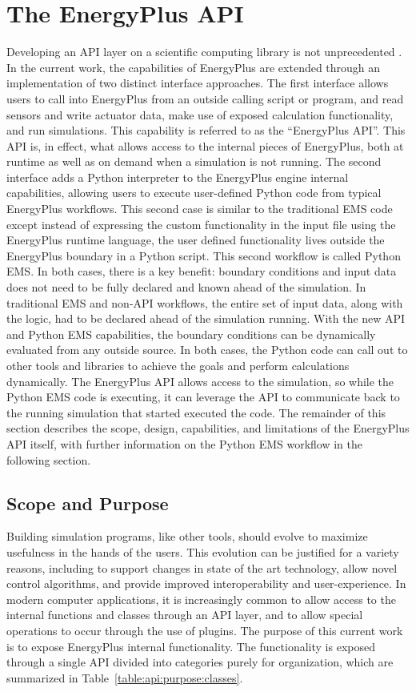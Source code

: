 \documentclass[5p, authoryear]{elsarticle}
\begin{document}
\section{The EnergyPlus API} 
Developing an API layer on a scientific computing library is not unprecedented \citep{Mohanan2018, Gratiy2018, Lotz2020}.
In the current work, the capabilities of EnergyPlus are extended through an implementation of two distinct interface approaches.
The first interface allows users to call into EnergyPlus from an outside calling script or program, and read sensors and write actuator data, make use of exposed calculation functionality, and run simulations.
This capability is referred to as the ``EnergyPlus API''.
This API is, in effect, what allows access to the internal pieces of EnergyPlus, both at runtime as well as on demand when a simulation is not running.
The second interface adds a Python interpreter to the EnergyPlus engine internal capabilities, allowing users to execute user-defined Python code from typical EnergyPlus workflows.  
This second case is similar to the traditional EMS code except instead of expressing the custom functionality in the input file using the EnergyPlus runtime language, the user defined functionality lives outside the EnergyPlus boundary in a Python script.
This second workflow is called Python EMS.
In both cases, there is a key benefit: boundary conditions and input data does not need to be fully declared and known ahead of the simulation.
In traditional EMS and non-API workflows, the entire set of input data, along with the logic, had to be declared ahead of the simulation running.
With the new API and Python EMS capabilities, the boundary conditions can be dynamically evaluated from any outside source.
In both cases, the Python code can call out to other tools and libraries to achieve the goals and perform calculations dynamically.
The EnergyPlus API allows access to the simulation, so while the Python EMS code is executing, it can leverage the API to communicate back to the running simulation that started executed the code.
The remainder of this section describes the scope, design, capabilities, and limitations of the EnergyPlus API itself, with further information on the Python EMS workflow in the following section.
 
  \subsection{Scope and Purpose}
Building simulation programs, like other tools, should evolve to maximize usefulness in the hands of the users.
This evolution can be justified for a variety reasons, including to support changes in state of the art technology, allow novel control algorithms, and provide improved interoperability and user-experience.
In modern computer applications, it is increasingly common to allow access to the internal functions and classes through an API layer, and to allow special operations to occur through the use of plugins.
The purpose of this current work is to expose EnergyPlus internal functionality.
The functionality is exposed through a single API divided into categories purely for organization, which are summarized in Table~\ref{table:api:purpose:classes}.
\end{document}
